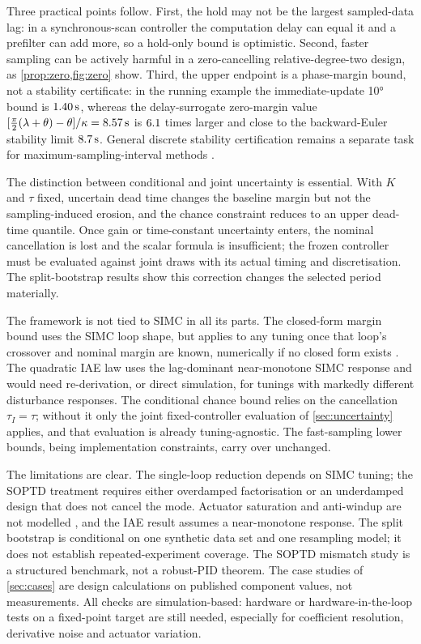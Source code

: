 \documentclass[a4paper,fleqn]{cas-sc}
\theoremstyle{remark}
\begin{document}
Three practical points follow. First, the hold may not be the largest sampled-data lag: in a synchronous-scan controller the computation delay can equal it and a prefilter can add more, so a hold-only bound is optimistic. Second, faster sampling can be actively harmful in a zero-cancelling relative-degree-two design, as \cref{prop:zero,fig:zero} show. Third, the upper endpoint is a phase-margin bound, not a stability certificate: in the running example the immediate-update \ang{10} bound is $\SI{1.40}{\second}$, whereas the delay-surrogate zero-margin value $[\frac{\pi}{2}(\lambda+\theta)-\theta]/\kappa=\SI{8.57}{\second}$ is $6.1$ times larger and close to the backward-Euler stability limit $\SI{8.7}{\second}$. General discrete stability certification remains a separate task for maximum-sampling-interval methods \citep{hetel2017recent,wang2025impulsive}.

The distinction between conditional and joint uncertainty is essential. With $K$ and $\tau$ fixed, uncertain dead time changes the baseline margin but not the sampling-induced erosion, and the chance constraint reduces to an upper dead-time quantile. Once gain or time-constant uncertainty enters, the nominal cancellation is lost and the scalar formula is insufficient; the frozen controller must be evaluated against joint draws with its actual timing and discretisation. The split-bootstrap results show this correction changes the selected period materially.

The framework is not tied to SIMC in all its parts. The closed-form margin bound uses the SIMC loop shape, but applies to any tuning once that loop's crossover and nominal margin are known, numerically if no closed form exists \citep{astrom2006advanced,garpinger2014performance}. The quadratic IAE law uses the lag-dominant near-monotone SIMC response and would need re-derivation, or direct simulation, for tunings with markedly different disturbance responses. The conditional chance bound relies on the cancellation $\tau_I=\tau$; without it only the joint fixed-controller evaluation of \cref{sec:uncertainty} applies, and that evaluation is already tuning-agnostic. The fast-sampling lower bounds, being implementation constraints, carry over unchanged.

The limitations are clear. The single-loop reduction depends on SIMC tuning; the SOPTD treatment requires either overdamped factorisation or an underdamped design that does not cancel the mode. Actuator saturation and anti-windup are not modelled \citep{astrom1989windup}, and the IAE result assumes a near-monotone response. The split bootstrap is conditional on one synthetic data set and one resampling model; it does not establish repeated-experiment coverage. The SOPTD mismatch study is a structured benchmark, not a robust-PID theorem. The case studies of \cref{sec:cases} are design calculations on published component values, not measurements. All checks are simulation-based: hardware or hardware-in-the-loop tests on a fixed-point target are still needed, especially for coefficient resolution, derivative noise and actuator variation.
\end{document}
